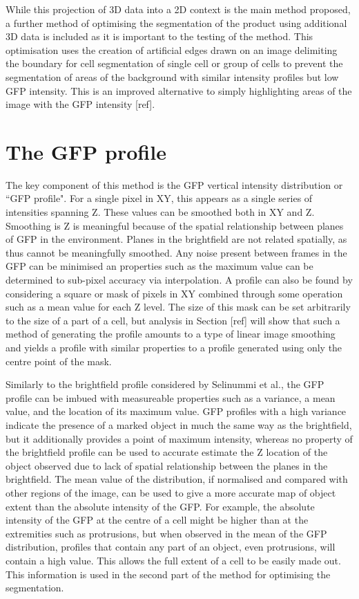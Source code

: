 While this projection of 3D data into a 2D context is the main method proposed, a further method of optimising the segmentation of the product using additional 3D data is included as it is important to the testing of the method. This optimisation uses the creation of artificial edges drawn on an image delimiting the boundary for cell segmentation of single cell or group of cells to prevent the segmentation of areas of the background with similar intensity profiles but low GFP intensity. This is an improved alternative to simply highlighting areas of the image with the GFP intensity [ref].

\section{The GFP profile}

The key component of this method is the GFP vertical intensity distribution or ``GFP profile". For a single pixel in XY, this appears as a single series of intensities spanning Z. These values can be smoothed both in XY and Z. Smoothing is Z is meaningful because of the spatial relationship between planes of GFP in the environment. Planes in the brightfield are not related spatially, as thus cannot be meaningfully smoothed. Any noise present between frames in the GFP can be minimised an properties such as the maximum value can be determined to sub-pixel accuracy via interpolation. A profile can also be found by considering a square or mask of pixels in XY combined through some operation such as a mean value for each Z level. The size of this mask can be set arbitrarily to the size of a part of a cell, but analysis in Section [ref] will show that such a method of generating the profile amounts to a type of linear image smoothing and yields a profile with similar properties to a profile generated using only the centre point of the mask.

Similarly to the brightfield profile considered by Selinummi et al., the GFP profile can be imbued with measureable properties such as a variance, a mean value, and the location of its maximum value. GFP profiles with a high variance indicate the presence of a marked object in much the same way as the brightfield, but it additionally provides a point of maximum intensity, whereas no property of the brightfield profile can be used to accurate estimate the Z location of the object observed due to lack of spatial relationship between the planes in the brightfield. The mean value of the distribution, if normalised and compared with other regions of the image, can be used to give a more accurate map of object extent than the absolute intensity of the GFP. For example, the absolute intensity of the GFP at the centre of a cell might be higher than at the extremities such as protrusions, but when observed in the mean of the GFP distribution, profiles that contain any part of an object, even protrusions, will contain a high value. This allows the full extent of a cell to be easily made out. This information is used in the second part of the method for optimising the segmentation.

